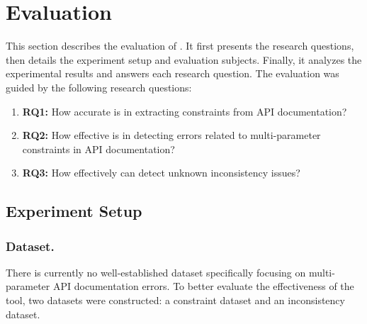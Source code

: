 \section{Evaluation}\label{sec:eval-mpchecker}
This section describes the evaluation of \toolchecker. It first presents the research questions, then details the experiment setup and evaluation subjects. Finally, it analyzes the experimental results and answers each research question. The evaluation was guided by the following research questions:

\begin{enumerate}
  \item \textbf{RQ1:} How accurate is \toolchecker in extracting constraints from API documentation?
  \item \textbf{RQ2:} How effective is \toolchecker in detecting errors related to multi-parameter constraints in API documentation?
  \item \textbf{RQ3:} How effectively can \toolchecker detect unknown inconsistency issues?
\end{enumerate}

\subsection{Experiment Setup}
\subsubsection{Dataset.}
There is currently no well-established dataset specifically focusing on multi-parameter API
documentation errors. To better evaluate the effectiveness of the tool, two datasets were constructed: a constraint dataset and an inconsistency dataset.


